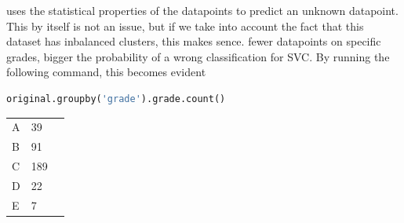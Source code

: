 \documentclass[openany]{article}
\begin{document}
			uses the statistical properties of the datapoints to predict an unknown datapoint. This by itself is not an issue, but if we take into account the fact 
			that this dataset has inbalanced clusters, this makes sence. fewer datapoints on specific grades, bigger the probability of a wrong classification for 
			SVC. By running the following command, this becomes evident
			 \begin{lstlisting}[language=Python]
original.groupby('grade').grade.count()	
			 \end{lstlisting}
			 \begin{table}[H]
			 	\centering
			 	\begin{tabular}{lll}
			 		A & 39  &  \\
			 		B & 91  &  \\
			 		C & 189 &  \\
			 		D & 22  &  \\
			 		E & 7   & 
			 	\end{tabular}
			 \end{table}
\end{document}

